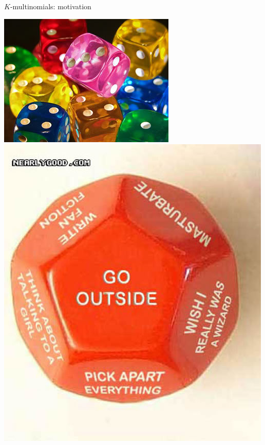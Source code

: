 \documentclass{beamer}
\begin{document}
\begin{frame}{$K$-multinomials: motivation}
\centerline{
  \includegraphics[height=.5\textheight]{ColorfulDice3D.jpg}
  \includegraphics[height=.5\textheight]{WarcraftFanDice.jpg}
}

\end{frame}
\end{document}
